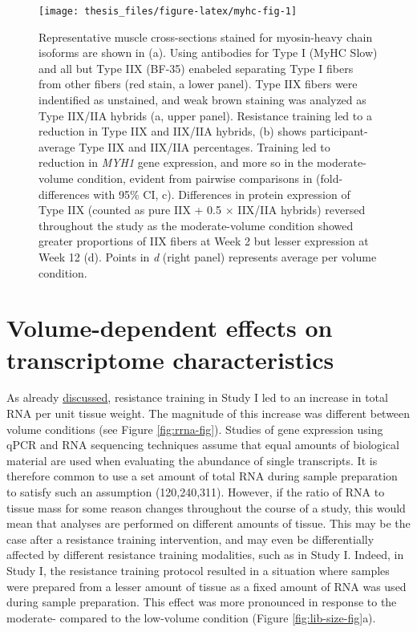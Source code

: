 \documentclass[twoside,10pt]{gihclass} %
\begin{document}
\pagebreak
\begin{figure}

{\centering \texttt{[image: thesis\_files/figure-latex/myhc-fig-1]} 

}

\caption[Fiber-type composition in Study I]{Representative muscle cross-sections stained for myosin-heavy chain isoforms are shown in (a). Using antibodies for Type I (MyHC Slow) and all but Type IIX (BF-35) enabeled separating Type I fibers from other fibers (red stain, a lower panel). Type IIX fibers were indentified as unstained, and weak brown staining was analyzed as Type IIX/IIA hybrids (a, upper panel). Resistance training led to a reduction in Type IIX and IIX/IIA hybrids, (b) shows participant-average Type IIX and IIX/IIA percentages. Training led to reduction in \textit{MYH1} gene expression, and more so in the moderate-volume condition, evident from pairwise comparisons in (fold-differences with 95\% CI, c). Differences in protein expression of Type IIX (counted as pure IIX + 0.5 $\times$ IIX/IIA hybrids) reversed throughout the study as the moderate-volume condition showed greater proportions of IIX fibers at Week 2 but lesser expression at Week 12 (d). Points in \textit{d} (right panel) represents average per volume condition.}\label{fig:myhc-fig}
\end{figure}
\pagebreak

\hypertarget{volume-dependent-effects-on-transcriptome-characteristics}{%
\section{Volume-dependent effects on transcriptome characteristics}\label{volume-dependent-effects-on-transcriptome-characteristics}}

As already \protect\hyperlink{muscle-mass-growth}{discussed}, resistance training in Study I led to an increase in total RNA per unit tissue weight. The magnitude of this increase was different between volume conditions (see Figure \ref{fig:rrna-fig}).
Studies of gene expression using qPCR and RNA sequencing techniques assume that equal amounts of biological material are used when evaluating the abundance of single transcripts.
It is therefore common to use a set amount of total RNA during sample preparation to satisfy such an assumption
(120,240,311).
However, if the ratio of RNA to tissue mass for some reason changes throughout the course of a study, this would mean that analyses are performed on different amounts of tissue. This may be the case after a resistance training intervention, and may even be differentially affected by different resistance training modalities, such as in Study I.
Indeed, in Study I, the resistance training protocol resulted in a situation where samples were prepared from a lesser amount of tissue as a fixed amount of RNA was used during sample preparation.
This effect was more pronounced in response to the moderate- compared to the low-volume condition (Figure \ref{fig:lib-size-fig}a).
\end{document}
